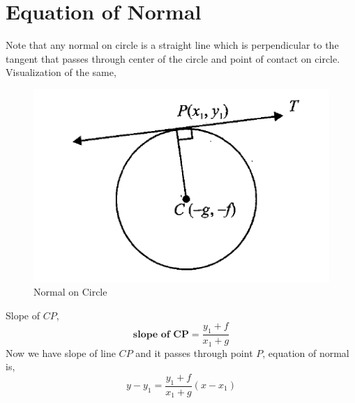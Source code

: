 \documentclass{article}
\begin{document}
\section{Equation of Normal}
Note that any normal on circle is a straight line which is perpendicular to the tangent that passes through center of the circle and point of contact on circle. Visualization of the same,
\begin{figure}[H]
    \centering
    \includegraphics[scale=0.5]{normal_of_circle.png}
    \caption{Normal on Circle}
\end{figure}
Slope of $CP$,
\begin{equation*}
    \textbf{slope of CP} = \frac{y_1+f}{x_1+g}
\end{equation*}
Now we have slope of line $CP$ and it passes through point $P$, equation of normal is,
\begin{equation*}
    y-y_1=\frac{y_1+f}{x_1+g}(x-x_1)
\end{equation*}
\end{document}
